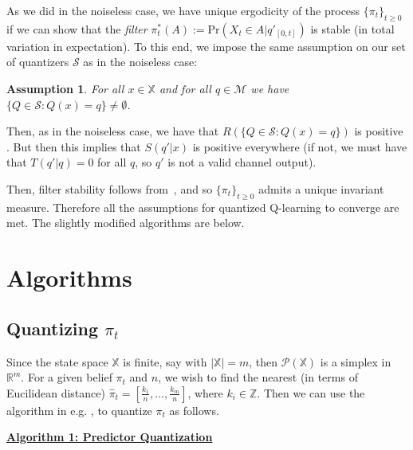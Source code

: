 \documentclass[conference]{IEEEtran}
\newtheorem{assumption}{Assumption}[section]
\begin{document}
As we did in the noiseless case, we have unique ergodicity of the process \(\{\pi_t\}_{t\ge0}\) if we can show that the \emph{filter} \(\pi^*_t(A) := \text{Pr}(X_t \in A | q'_{[0,t]})\) is stable (in total variation in expectation). To this end, we impose the same assumption on our set of quantizers \(\mathcal{S}\) as in the noiseless case:

\begin{assumption}\label{assumption:one-bin}
    For all \(x \in \mathbb{X} \) and for all \(q \in \mathcal{M} \) we have \(\{Q \in \mathcal{S} : Q(x) = q\} \neq \emptyset \).
\end{assumption}

Then, as in the noiseless case, we have that \(R(\{Q \in \mathcal{S} : Q(x)=q\})\) is positive . But then this implies that \(S(q'|x)\) is positive everywhere (if not, we must have that \(T(q'|q)=0\) for all \(q\), so \(q'\) is not a valid channel output).

Then, filter stability follows from~\cite[Corollary 5.5]{Handel}, and so \( \{\pi_t\}_{t\ge0} \) admits a unique invariant measure. Therefore all the assumptions for quantized Q-learning to converge are met. The slightly modified algorithms are below.

\section{Algorithms}\label{section:Algorithms}
\subsection{Quantizing \( \pi_t \)}\label{algorithm1}
Since the state space \( \mathbb{X} \) is finite, say with \( |\mathbb{X}| = m \), then \( \mathcal{P}(\mathbb{X}) \) is a simplex in \( \mathbb{R}^m \). For a given belief \( \pi_t \) and \( n \), we wish to find the nearest (in terms of Eucilidean distance) \( \hat{\pi}_t = [\frac{k_1}{n}, \ldots, \frac{k_m}{n}] \), where \( k_i \in \mathbb{Z} \). Then we can use the algorithm in e.g. \cite{Reznik}, \cite{Saldi} to quantize \(\pi_t\) as follows. %

\vspace{1em}

\noindent \underline{\textbf{Algorithm 1: Predictor Quantization}}
\end{document}
